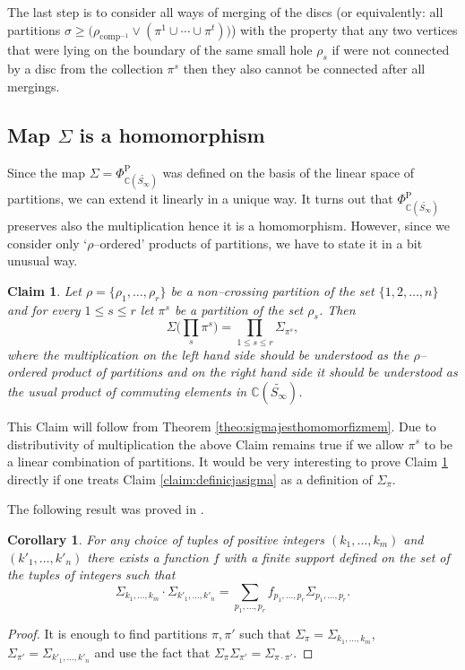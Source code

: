 \documentclass[12pt,dvips]{amsart}
\numberwithin{equation}{section} \numberwithin{figure}{section}
\theoremstyle{plain}
\newtheorem{corollary}[lemma]{Corollary}
\newtheorem{claim}[lemma]{Claim}
\theoremstyle{definition}
\theoremstyle{remark}
\newcommand{\C}{{\mathbb{C}}}
\newcommand{\Sn}[1]{{{S}}_{#1}}
\newcommand{\fppsinf}{\Phi^{\pp}_{\C(\PartPerm{\infty})}}
\newcommand{\PartPerm}[1]{\widetilde{\Sn{#1}}}
\DeclareMathOperator{\comp}{comp}
\newcommand{\compinv}{{\comp^{-1}}}
\DeclareMathOperator{\pp}{P}
\begin{document}
The last step is to consider all ways of merging of the discs (or
equivalently: all partitions $\sigma\geq \big( \rho_{\compinv} \vee
(\pi^1 \cup \cdots \cup\pi^t)\big) $) with the property that any two
vertices that were lying on the boundary of the same small hole
$\rho_s$ if were not connected by a disc from the collection $\pi^s$
then they also cannot be connected after all mergings.

\subsection{Map $\Sigma$ is a homomorphism}
Since the map $\Sigma=\fppsinf$ was defined on the basis of the
linear space of partitions, we can extend it linearly in a unique
way. It turns out that $\fppsinf$ preserves also the multiplication
hence it is a homomorphism. However, since we consider only
`$\rho$--ordered' products of partitions, we have to state it in a
bit unusual way.
\begin{claim}
\label{claim:mnozenie} Let $\rho=\{\rho_1,\dots,\rho_r\}$ be a
non--crossing partition of the set $\{1,2,\dots,n\}$ and for every
$1\leq s\leq r$ let $\pi^s$ be a partition of the set $\rho_s$. Then
$$\Sigma\Big( \prod_{s} \pi^s \Big)=\prod_{1\leq s\leq r} \Sigma_{\pi^s},$$
where the multiplication on the left hand side should be understood
as the $\rho$--ordered product of partitions and on the right hand
side it should be understood as the usual product of commuting
elements in $\C(\PartPerm{\infty})$.
\end{claim}
This Claim will follow from Theorem
\ref{theo:sigmajesthomomorfizmem}. Due to distributivity of
multiplication the above Claim remains true if we allow $\pi^s$ to
be a linear combination of partitions. It would be very interesting
to prove Claim \ref{claim:mnozenie} directly if one treats Claim
\ref{claim:definicjasigma} as a definition of $\Sigma_{\pi}$.

The following result was proved in
\cite{KerovOlshanski1994,IvanovKerov1999,LascouxThibon2001vertex,BianeCharacters}.
\begin{corollary}
\label{cor:uniwersalnestale} For any choice of tuples of positive
integers $(k_1,\dots,k_m)$ and $(k'_1,\dots,k'_n)$ there exists a
function $f$ with a finite support defined on the set of the tuples
of integers such that \begin{equation} \label{eq:glod}
\Sigma_{k_1,\dots,k_m} \cdot \Sigma_{k'_1,\dots,k'_n} =
\sum_{p_1,\dots,p_r} f_{p_1,\dots,p_r}
\Sigma_{p_1,\dots,p_r}.\end{equation}
%
\end{corollary}
\begin{proof}
It is enough to find partitions $\pi, \pi'$ such that
$\Sigma_{\pi}=\Sigma_{k_1,\dots,k_m}$,
$\Sigma_{\pi'}=\Sigma_{k'_1,\dots,k'_n}$ and use the fact that
$\Sigma_{\pi} \Sigma_{\pi'}=\Sigma_{\pi \cdot \pi'}$.
\end{proof}
\end{document}
